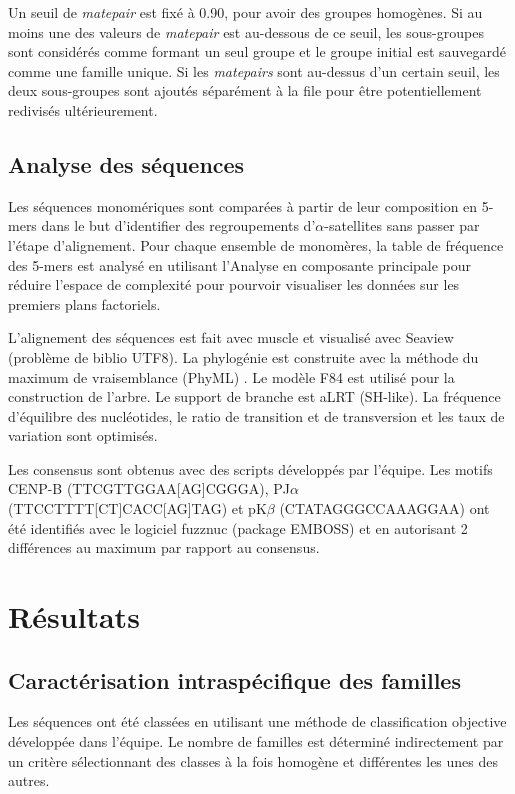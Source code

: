 \documentclass[12pt,a4paper]{article}
\begin{document}
Un seuil de \textit{matepair} est fixé à 0.90, pour avoir des groupes homogènes. Si au moins une des valeurs de \textit{matepair} est au-dessous de ce seuil, les sous-groupes sont considérés comme formant un seul groupe et le groupe initial est sauvegardé comme une famille unique. Si les \textit{matepairs} sont au-dessus d’un certain seuil, les deux sous-groupes sont ajoutés séparément à la file pour être potentiellement redivisés ultérieurement.

	\subsection{Analyse des séquences}
	
Les séquences monomériques sont comparées à partir de leur composition en 5-mers dans le but d'identifier des regroupements d'$\alpha$-satellites sans passer par l'étape d'alignement. Pour chaque ensemble de monomères,	la table de fréquence des 5-mers est analysé en utilisant l'Analyse en composante principale pour réduire l'espace de complexité pour pourvoir visualiser les données sur les premiers plans factoriels.
	
L'alignement des séquences est fait avec muscle \cite{Edgar2004} et visualisé avec Seaview (problème de biblio UTF8). La phylogénie est construite avec la méthode du maximum de vraisemblance (PhyML) \cite{Guindon2009}. Le modèle F84 est utilisé pour la construction de l'arbre. Le support de branche est aLRT (SH-like). La fréquence d'équilibre des nucléotides, le ratio de transition et de transversion et les taux de variation sont optimisés.

Les consensus sont obtenus avec des scripts développés par l'équipe. Les motifs CENP-B (TTCGTTGGAA[AG]CGGGA), PJ$\alpha$ (TTCCTTTT[CT]CACC[AG]TAG) et pK$\beta$ (CTATAGGGCCAAAGGAA) ont été identifiés avec le logiciel fuzznuc (package EMBOSS) \cite{Rice2000} et en autorisant 2 différences au maximum par rapport au consensus.

\section{Résultats}
	\subsection{Caractérisation intraspécifique des familles}
	Les séquences ont été classées en utilisant une méthode de classification objective développée dans l'équipe. Le nombre de familles est déterminé indirectement par un critère sélectionnant des classes à la fois homogène et différentes les unes des autres.
	
\end{document}
